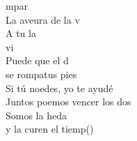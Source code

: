 \documentclass[12pt]{article}
\begin{document}
\begin{multicols*}{2}
\begin{cancion}
	\begin{chorus}%
	mpar\\
	La aveura de la v\\
	A tu la\\
	vi \\
	Puede que el d\\
	se rompatus pies \\
	Si tú noedes, yo te ayudé \\
	Juntos poemos vencer los dos\\
	Somos la heda \\
	y la curen el tiemp()\\
	\end{chorus}%
	\jump\\
\end{cancion}%


\end{multicols*}
\end{document}
